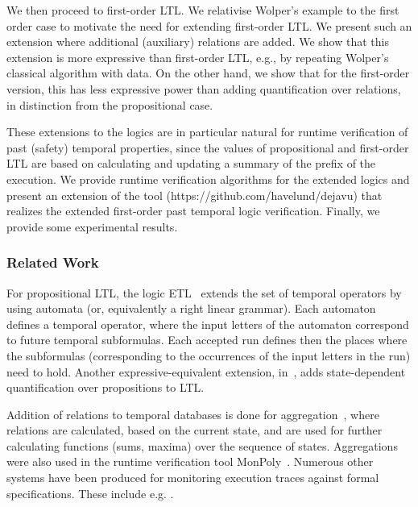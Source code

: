 We then proceed to first-order LTL. We relativise Wolper's example to the first
order case to motivate the need for
extending first-order LTL.
We present such an extension where additional (auxiliary) relations are
added. We show that this extension is more expressive than
first-order LTL, e.g., by repeating Wolper's classical algorithm
with data. On the other hand, we show that for the first-order version, this has less 
expressive power than adding quantification over relations, in distinction from the propositional case.

These extensions to the logics are in particular natural for
runtime verification of past (safety) temporal properties, since
the values of propositional and first-order LTL are based
on calculating and updating a summary of the prefix of the execution.
We provide runtime verification algorithms for the extended
logics and present an extension of the 
\dejavu{} tool (https://github.com/havelund/dejavu) that
realizes the extended first-order past temporal logic verification.
Finally, we provide some experimental results.

\subsubsection{Related Work}

For propositional LTL, the logic ETL~\cite{WVS,Wolper} extends
the set of temporal operators 
by using automata (or, equivalently a right linear grammar). Each automaton defines a temporal operator,
where the input letters of the automaton correspond to future temporal subformulas. Each accepted run defines then the places
where the subformulas (corresponding to the occurrences of the input letters in the run) need to hold. Another expressive-equivalent extension, 
in~\cite{Wolper}, adds
state-dependent quantification over propositions to LTL.

Addition of relations to temporal databases is done
for aggregation~\cite{Libkin}, where relations are
calculated, based on the current state, and are used for further calculating
functions (sums, maxima) over the sequence of states. Aggregations were also used in the runtime verification tool 
{\sf MonPoly}~\cite{agrebasin}.
%
%
Numerous other systems have been produced for monitoring
execution traces against formal specifications. 
These include e.g. \cite{Meredith2011,larva,Reger2015,halle-beepbeep-ieee-12,LOLA}. 


